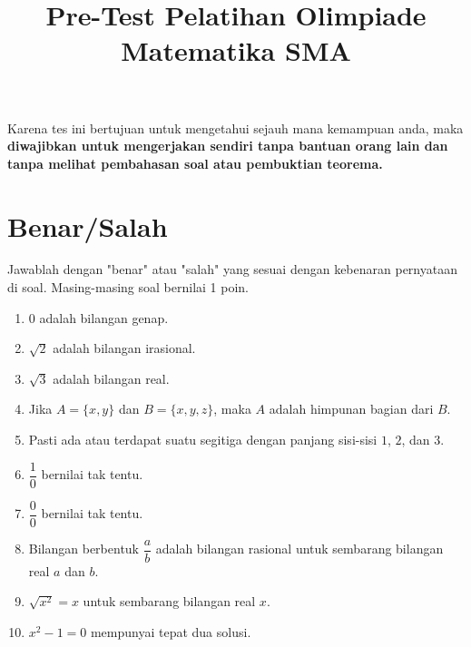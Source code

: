 \documentclass[12pt]{scrartcl}
\title{Pre-Test Pelatihan Olimpiade Matematika SMA}
\date{}
\begin{document}
	\maketitle

\renewcommand*\contentsname{Daftar Isi}
\tableofcontents

\newpage
	Karena tes ini bertujuan untuk mengetahui sejauh mana kemampuan anda, maka
	\textbf{diwajibkan untuk mengerjakan sendiri tanpa bantuan orang lain dan tanpa melihat pembahasan soal atau pembuktian teorema.}

\section{Benar/Salah}
Jawablah dengan "benar" atau "salah" yang sesuai dengan kebenaran pernyataan di soal. Masing-masing soal bernilai 1 poin.
\begin{enumerate}
	\item 0 adalah bilangan genap.
	
	\item $\sqrt{2}$ adalah bilangan irasional.
	
	\item $\sqrt{3}$ adalah bilangan real.
	
	\item Jika $A = \{x,y\}$ dan $B = \{x,y,z\}$, maka $A$ adalah himpunan bagian dari $B$.
	
	\item Pasti ada atau terdapat suatu segitiga dengan panjang sisi-sisi $1$, $2$, dan $3$.
	
	\item $\dfrac{1}{0}$ bernilai tak tentu.
	
	\item $\dfrac{0}{0}$ bernilai tak tentu.
	
	\item Bilangan berbentuk $\dfrac{a}{b}$ adalah bilangan rasional untuk sembarang bilangan real $a$ dan $b$.
	
	\item $\sqrt{x^2} = x$ untuk sembarang bilangan real $x$.
	
	\item $x^2-1=0$ mempunyai tepat dua solusi.
\end{enumerate}
\end{document}
